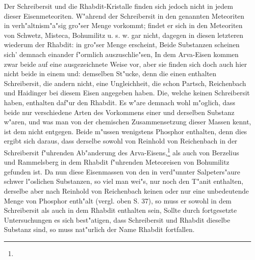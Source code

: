 \documentclass[a4paper, 11pt, oneside]{article}
\begin{document}
Der Schreibersit und die Rhabdit-Kristalle finden sich jedoch nicht in jedem dieser Eisenmeteoriten. W"ahrend der Schreibersit in den genannten Meteoriten in verh"altnism"a"sig gro"ser Menge vorkommt; findet er sich in den Meteoriten von Schwetz, Misteca, Bohumilitz u. s. w. gar nicht, dagegen in diesen letzteren wiederum der Rhabdit: in gro"ser Menge erscheint, Beide Substanzen scheinen sich’ demnach einander f"ormlich auszuschlie"sen, In dem Arva-Eisen kommen zwar beide auf eine ausgezeichnete Weise vor, aber sie finden sich doch auch hier nicht beide in einem und: demselben St"ucke, denn die einen enthalten Schreibersit, die andern nicht, eine Ungleichheit, die schon Partsch, Reichenbach und Haidinger bei diesem Eisen angegeben haben. Die, welche keinen Schreibersit haben, enthalten daf"ur den Rhabdit. Es w"are demnach wohl m"oglich, dass beide nur verschiedene Arten des Vorkommens einer und derselben Substanz w"aren, und was man von der chemischen Zusammensetzung dieser Massen kennt, ist dem nicht entgegen. Beide m"ussen wenigstens Phosphor enthalten, denn dies ergibt sich daraus, dass derselbe sowohl von Reinhold von Reichenbach in der Schreibersit f"uhrenden Ab"anderung des Arva-Eisens,\footnote{} als auch von Berzelius und Rammelsberg in dem Rhabdit f"uhrenden Meteoreisen von Bohumilitz gefunden ist. Da nun diese Eisenmassen von den in verd"unnter Salpeters"aure schwer l"oslichen Substanzen, so viel man wei"s, nur noch den T"anit enthalten, derselbe aber nach Reinhold von Reichenbach keinen oder nur eine unbedeutende Menge von Phosphor enth"alt (vergl. oben S. 37), so muss er sowohl in dem Schreibersit als auch in dem Rhabdit enthalten sein, Sollte durch fortgesetzte Untersuchungen es sich best"atigen, dass Schreibersit und Rhabdit dieselbe Substanz sind‚ so muss nat"urlich der Name Rhabdit fortfallen.
\end{document}

